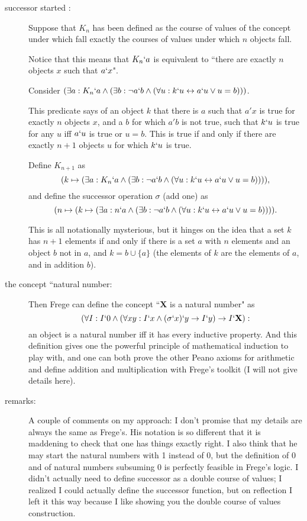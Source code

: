 \documentclass[12pt]{article}
\begin{document}
\begin{description}
\begin{description}
\item[successor started :]  Suppose that $K_n$ has been defined as the course of values of the concept under which fall exactly the courses of values under which $n$ objects fall.  

Notice that this means that $K_n`a$ is equivalent to ``there are exactly $n$ objects $x$ such that $a`x$".

Consider $(\exists a:K_n`a \wedge (\exists b: \neg a`b \wedge (\forall u:k`u \leftrightarrow a`u \vee u=b)))$.

This predicate says of an object $k$ that there is $a$ such that $a'x$ is true for exactly $n$ objects $x$,  and a $b$ for which $a'b$ is not true, such that $k`u$ is true for any $u$ iff $a`u$ is true or $u=b$.  This is true if and only if there are exactly $n+1$ objects $u$ for which $k`u$ is true.

Define $K_{n+1}$ as $$(k \mapsto (\exists a:K_n`a \wedge (\exists b: \neg a`b \wedge (\forall u:k`u \leftrightarrow a`u \vee u=b)))),$$ and define
the successor operation $\sigma$ (add one) as $$(n \mapsto (k \mapsto (\exists a:n`a \wedge (\exists b: \neg a`b \wedge (\forall u:k`u \leftrightarrow a`u \vee u=b)))).$$

This is all notationally mysterious, but it hinges on the idea that a set $k$ has $n+1$ elements if and only if there is a set $a$ with $n$ elements and an object $b$ not in $a$,
and $k = b \cup \{a\}$ (the elements of $k$ are the elements of $a$, and in addition $b$).

\item[the concept ``natural number:]  Then Frege can define the concept ``{\bf X} is a natural number" as $$(\forall I:I`0 \wedge (\forall xy:I`x \wedge (\sigma`x)`y \rightarrow I`y) \rightarrow I`{\bf X}):$$  an object is a natural number iff it has every inductive property.  And this definition gives one the powerful principle of mathematical induction to play with, and one can both prove the other Peano axioms for arithmetic and define addition and multiplication with Frege's toolkit (I will not give details here).

\item[remarks:]  A couple of comments on my approach:  I don't promise that my details are always the same as Frege's.  His notation is so different that it is maddening to check that one has things exactly right.  I also think that he may start the natural numbers with 1 instead of 0, but the definition of 0 and of natural numbers subsuming 0 is perfectly feasible in Frege's logic.  I didn't actually need to define successor as a double course of values;  I realized I could actually define the successor function, but on reflection I left it this way because I like showing you the double course of values construction.


\end{description}
\end{description}
\end{document}
